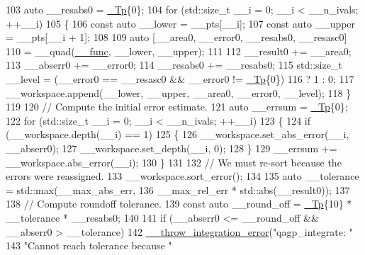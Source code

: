 \begin{DoxyCode}
103       \textcolor{keyword}{auto} \_\_resabs0 = \hyperlink{namespace____gnu__cxx_a3b19a9c800ca194374ef9172290f7d79}{\_Tp}\{0\};
104       \textcolor{keywordflow}{for} (std::size\_t \_\_i = 0; \_\_i < \_\_n\_ivals; ++\_\_i)
105         \{
106           \textcolor{keyword}{const} \textcolor{keyword}{auto} \_\_lower = \_\_pts[\_\_i];
107           \textcolor{keyword}{const} \textcolor{keyword}{auto} \_\_upper = \_\_pts[\_\_i + 1];
108 
109           \textcolor{keyword}{auto} [\_\_area0, \_\_error0, \_\_resabs0, \_\_resasc0]
110             = \_\_quad(\hyperlink{namespace____gnu__cxx_af2b2f0c7a2ae72b922b1afefae5a65b2}{\_\_func}, \_\_lower, \_\_upper);
111 
112           \_\_result0 += \_\_area0;
113           \_\_abserr0 += \_\_error0;
114           \_\_resabs0 += \_\_resabs0;
115           std::size\_t \_\_level = (\_\_error0 == \_\_resasc0 && \_\_error0 != \hyperlink{namespace____gnu__cxx_a3b19a9c800ca194374ef9172290f7d79}{\_Tp}\{0\})
116                                 ? 1 : 0;
117           \_\_workspace.append(\_\_lower, \_\_upper, \_\_area0, \_\_error0, \_\_level);
118         \}
119 
120       \textcolor{comment}{// Compute the initial error estimate.}
121       \textcolor{keyword}{auto} \_\_errsum = \hyperlink{namespace____gnu__cxx_a3b19a9c800ca194374ef9172290f7d79}{\_Tp}\{0\};
122       \textcolor{keywordflow}{for} (std::size\_t \_\_i = 0; \_\_i < \_\_n\_ivals; ++\_\_i)
123         \{
124           \textcolor{keywordflow}{if} (\_\_workspace.depth(\_\_i) == 1)
125             \{
126               \_\_workspace.set\_abs\_error(\_\_i, \_\_abserr0);
127               \_\_workspace.set\_depth(\_\_i, 0);
128             \}
129           \_\_errsum += \_\_workspace.abs\_error(\_\_i);
130         \}       
131 
132       \textcolor{comment}{// We must re-sort because the errors were reassigned.}
133       \_\_workspace.sort\_error();
134 
135       \textcolor{keyword}{auto} \_\_tolerance = std::max(\_\_max\_abs\_err,
136                                   \_\_max\_rel\_err * std::abs(\_\_result0));
137 
138       \textcolor{comment}{// Compute roundoff tolerance.}
139       \textcolor{keyword}{const} \textcolor{keyword}{auto} \_\_round\_off = \hyperlink{namespace____gnu__cxx_a3b19a9c800ca194374ef9172290f7d79}{\_Tp}\{10\} * \_\_tolerance * \_\_resabs0;
140 
141       \textcolor{keywordflow}{if} (\_\_abserr0 <= \_\_round\_off && \_\_abserr0 > \_\_tolerance)
142         \hyperlink{namespace____gnu__cxx_a2ae22137ca092b8ae10f4d42b4e32cfb}{\_\_throw\_integration\_error}(\textcolor{stringliteral}{"qagp\_integrate: "}
143                                   \textcolor{stringliteral}{"Cannot reach tolerance because "}

\end{DoxyCode}
